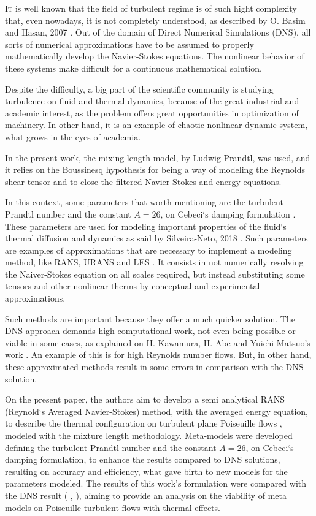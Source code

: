 \documentclass[10pt]{article} %
\begin{document}
\lettrine[nindent=0em,lines=2]{I}t is well known that the field of turbulent regime is of such hight complexity that, even nowadays, it is not completely understood, as described by O. Basim and Hasan, 2007 \cite{hasan}. Out of the domain of Direct Numerical Simulations (DNS), all sorts of numerical approximations have to be assumed to properly mathematically develop the Navier-Stokes equations. The nonlinear behavior of these systems \cite{John} make difficult for a continuous mathematical solution. 

Despite the difficulty, a big part of the scientific community is studying turbulence on fluid and thermal dynamics, because of the great industrial and academic interest, as the problem offers great opportunities in optimization of machinery. In other hand, it is an example of chaotic nonlinear dynamic system, what grows in the eyes of academia.   

In the present work, the mixing length model, by Ludwig Prandtl, was used, and it relies on the Boussinesq hypothesis for being a way of modeling the Reynolds shear tensor and to close the filtered Navier-Stokes and energy equations.

In this context, some parameters that worth mentioning are the turbulent Prandtl number \cite{Prandtl} and the constant $A = 26$, on Cebeci`s damping formulation \cite{Cebeci}. These parameters are used for modeling important properties of the fluid`s thermal diffusion and dynamics as said by Silveira-Neto, 2018 \cite{aristeu}. Such parameters are examples of approximations that are necessary to implement a modeling method, like RANS, URANS and LES \cite{aristeu}. It consists in not numerically resolving the Naiver-Stokes equation on all scales required, but instead substituting some tensors and other nonlinear therms by conceptual and experimental approximations.

Such methods are important because they offer a much quicker solution. The DNS approach demands high computational work, not even being possible or viable in some cases, as explained on H. Kawamura, H. Abe and Yuichi Matsuo's work \cite{Abe}. An example of this is for high Reynolds number flows. But, in other hand, these approximated methods result in some errors in comparison with the DNS solution.    

On the present paper, the authors aim to develop a semi analytical RANS (Reynold`s Averaged Navier-Stokes) method, with the averaged energy equation, to describe the thermal configuration on turbulent plane Poiseuille flows \cite{Poiseuille}, modeled with the mixture length methodology. Meta-models were developed defining the turbulent Prandtl number \cite{Prandtl} and the constant $A = 26$, on Cebeci`s damping formulation, to enhance the results compared to DNS solutions, resulting on accuracy and efficiency, what gave birth to new models for the parameters modeled. The results of this work's formulation were compared with the DNS result (\cite{DNS1020} , \cite{DNS150}), aiming to provide an analysis on the viability of meta models on Poiseuille turbulent flows with thermal effects. \\       
 
\end{document}
